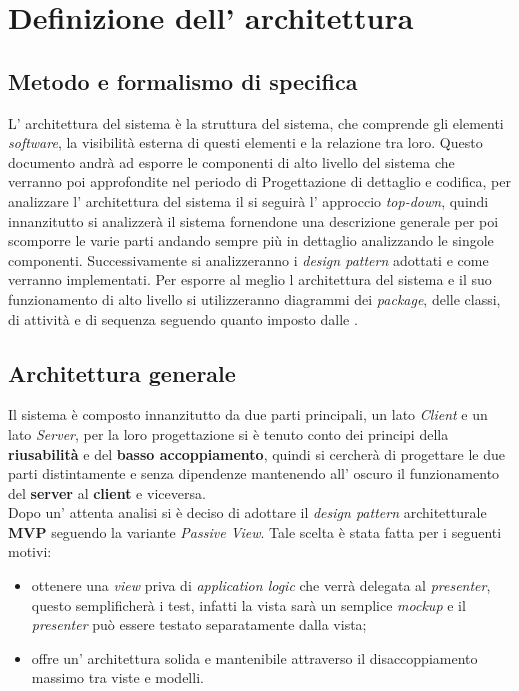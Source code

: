\section{Definizione dell' architettura}
\subsection{Metodo e formalismo di specifica}
L' architettura del sistema è la struttura del sistema, che comprende gli elementi \textit{software}, la visibilità esterna di questi elementi e la relazione tra loro.
Questo documento andrà ad esporre le componenti di alto livello del sistema che verranno poi approfondite nel periodo di Progettazione di dettaglio e codifica, per analizzare l' architettura del sistema il \progetto si seguirà l' approccio \textit{top-down}, quindi innanzitutto si analizzerà il sistema fornendone una descrizione generale per poi scomporre le varie parti andando sempre più in dettaglio analizzando le singole componenti.
Successivamente si analizzeranno i \textit{design pattern} adottati e come verranno implementati.
Per esporre al meglio l architettura del sistema e il suo funzionamento di alto livello si utilizzeranno diagrammi dei \textit{package}, delle classi, di attività e di sequenza seguendo quanto imposto dalle \NormeDiProgetto{}.
\subsection{Architettura generale}
Il sistema \progetto{} è composto innanzitutto da due parti principali, un lato \textit{Client} e un lato \textit{Server}, per la loro progettazione si è tenuto conto dei principi della \textbf{riusabilità} e del \textbf{basso accoppiamento}, quindi si cercherà di progettare le due parti distintamente e senza dipendenze mantenendo all' oscuro il funzionamento del \textbf{server} al \textbf{client} e viceversa.\\
Dopo un' attenta analisi si è deciso di adottare il \textit{design pattern} architetturale \textbf{MVP} seguendo la variante \textit{Passive View}. Tale scelta è stata fatta per i seguenti motivi:
\begin{itemize}
490.317 visualizzazioni
	\item ottenere una \textit{view} priva di \textit{application logic} che verrà delegata al \textit{presenter}, questo semplificherà i test, infatti la vista sarà un semplice \textit{mockup} e il \textit{presenter} può essere testato separatamente dalla vista;
	\item offre un' architettura solida e mantenibile attraverso il disaccoppiamento massimo tra viste e modelli.
\end{itemize}
